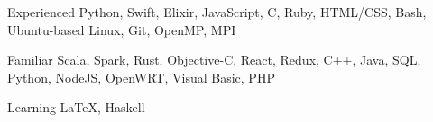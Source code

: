 

\begin{cvskills}

  \cvskill
  {Experienced} %
  {Python, Swift, Elixir, JavaScript, C, Ruby, HTML/CSS, Bash, Ubuntu-based Linux, Git, OpenMP, MPI} %

  \cvskill
  {Familiar} %
  {Scala, Spark, Rust, Objective-C, React, Redux, C++, Java, SQL, Python, NodeJS, OpenWRT, Visual Basic, PHP} %

  \cvskill
  {Learning} %
  {\LaTeX, Haskell} %



\end{cvskills}
